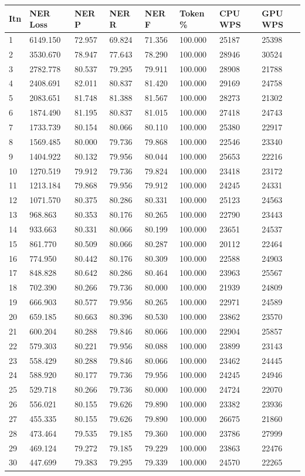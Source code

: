 \documentclass[12pt,a4paper,]{scrartcl}
\begin{document}
\begin{longtable}[]{@{}llllllll@{}}
\toprule
Itn & NER Loss & NER P & NER R & NER F & Token \% & CPU WPS & GPU WPS\tabularnewline
\midrule
\endhead
1 & 6149.150 & 72.957 & 69.824 & 71.356 & 100.000 & 25187 & 25398\tabularnewline
2 & 3530.670 & 78.947 & 77.643 & 78.290 & 100.000 & 28946 & 30524\tabularnewline
3 & 2782.778 & 80.537 & 79.295 & 79.911 & 100.000 & 28908 & 21788\tabularnewline
4 & 2408.691 & 82.011 & 80.837 & 81.420 & 100.000 & 29169 & 24758\tabularnewline
5 & 2083.651 & 81.748 & 81.388 & 81.567 & 100.000 & 28273 & 21302\tabularnewline
6 & 1874.490 & 81.195 & 80.837 & 81.015 & 100.000 & 27418 & 24743\tabularnewline
7 & 1733.739 & 80.154 & 80.066 & 80.110 & 100.000 & 25380 & 22917\tabularnewline
8 & 1569.485 & 80.000 & 79.736 & 79.868 & 100.000 & 22546 & 23340\tabularnewline
9 & 1404.922 & 80.132 & 79.956 & 80.044 & 100.000 & 25653 & 22216\tabularnewline
10 & 1270.519 & 79.912 & 79.736 & 79.824 & 100.000 & 23418 & 23172\tabularnewline
11 & 1213.184 & 79.868 & 79.956 & 79.912 & 100.000 & 24245 & 24331\tabularnewline
12 & 1071.570 & 80.375 & 80.286 & 80.331 & 100.000 & 25123 & 24563\tabularnewline
13 & 968.863 & 80.353 & 80.176 & 80.265 & 100.000 & 22790 & 23443\tabularnewline
14 & 933.663 & 80.331 & 80.066 & 80.199 & 100.000 & 23651 & 24537\tabularnewline
15 & 861.770 & 80.509 & 80.066 & 80.287 & 100.000 & 20112 & 22464\tabularnewline
16 & 774.950 & 80.442 & 80.176 & 80.309 & 100.000 & 22588 & 24903\tabularnewline
17 & 848.828 & 80.642 & 80.286 & 80.464 & 100.000 & 23963 & 25567\tabularnewline
18 & 702.390 & 80.266 & 79.736 & 80.000 & 100.000 & 21939 & 24809\tabularnewline
19 & 666.903 & 80.577 & 79.956 & 80.265 & 100.000 & 22971 & 24589\tabularnewline
20 & 659.185 & 80.663 & 80.396 & 80.530 & 100.000 & 23862 & 23570\tabularnewline
21 & 600.204 & 80.288 & 79.846 & 80.066 & 100.000 & 22904 & 25857\tabularnewline
22 & 579.303 & 80.221 & 79.956 & 80.088 & 100.000 & 23899 & 23143\tabularnewline
23 & 558.429 & 80.288 & 79.846 & 80.066 & 100.000 & 23462 & 24445\tabularnewline
24 & 588.920 & 80.177 & 79.736 & 79.956 & 100.000 & 24245 & 24946\tabularnewline
25 & 529.718 & 80.266 & 79.736 & 80.000 & 100.000 & 24724 & 22070\tabularnewline
26 & 556.021 & 80.155 & 79.626 & 79.890 & 100.000 & 23382 & 23936\tabularnewline
27 & 455.335 & 80.155 & 79.626 & 79.890 & 100.000 & 26675 & 21860\tabularnewline
28 & 473.464 & 79.535 & 79.185 & 79.360 & 100.000 & 23786 & 27999\tabularnewline
29 & 469.124 & 79.272 & 79.185 & 79.229 & 100.000 & 23863 & 22476\tabularnewline
30 & 447.699 & 79.383 & 79.295 & 79.339 & 100.000 & 24570 & 22265\tabularnewline
\bottomrule
\end{longtable}
\end{document}

